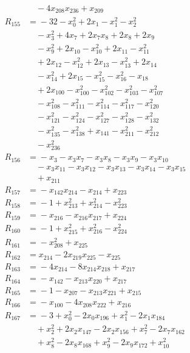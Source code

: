 \begin{align*}
&\quad{} -4x_{208}x_{236} +x_{209} \\
R_{155} &={} -32 -x_{0}^{2} +2x_{1} -x_{1}^{2} -x_{2}^{2} \\
&\quad{} -x_{3}^{2} +4x_{7} +2x_{7}x_{8} +2x_{8} +2x_{9} \\
&\quad{} -x_{9}^{2} +2x_{10} -x_{10}^{2} +2x_{11} -x_{11}^{2} \\
&\quad{} +2x_{12} -x_{12}^{2} +2x_{13} -x_{13}^{2} +2x_{14} \\
&\quad{} -x_{14}^{2} +2x_{15} -x_{15}^{2} -x_{16}^{2} -x_{18} \\
&\quad{} +2x_{100} -x_{100}^{2} -x_{102}^{2} -x_{103}^{2} -x_{107}^{2} \\
&\quad{} -x_{108}^{2} -x_{111}^{2} -x_{114}^{2} -x_{117}^{2} -x_{120}^{2} \\
&\quad{} -x_{121}^{2} -x_{124}^{2} -x_{127}^{2} -x_{128}^{2} -x_{132}^{2} \\
&\quad{} -x_{135}^{2} -x_{138}^{2} +x_{141} -x_{211}^{2} -x_{212}^{2} \\
&\quad{} -x_{236}^{2} \\
R_{156} &={} -x_{3} -x_{3}x_{7} -x_{3}x_{8} -x_{3}x_{9} -x_{3}x_{10} \\
&\quad{} -x_{3}x_{11} -x_{3}x_{12} -x_{3}x_{13} -x_{3}x_{14} -x_{3}x_{15} \\
&\quad{} +x_{211} \\
R_{157} &={} -x_{142}x_{214} -x_{214} +x_{223} \\
R_{158} &={} -1 +x_{213}^{2} +x_{214}^{2} -x_{223}^{2} \\
R_{159} &={} -x_{216} -x_{216}x_{217} +x_{224} \\
R_{160} &={} -1 +x_{215}^{2} +x_{216}^{2} -x_{224}^{2} \\
R_{161} &={} -x_{208}^{2} +x_{225} \\
R_{162} &={} x_{214} -2x_{219}x_{225} -x_{225} \\
R_{163} &={} -4x_{214} -8x_{214}x_{218} +x_{217} \\
R_{164} &={} -x_{142} -x_{213}x_{220} +x_{217} \\
R_{165} &={} -1 -x_{207} -x_{213}x_{221} +x_{215} \\
R_{166} &={} -x_{100} -4x_{208}x_{222} +x_{216} \\
R_{167} &={} -3 +x_{0}^{2} -2x_{0}x_{196} +x_{1}^{2} -2x_{1}x_{184} \\
&\quad{} +x_{2}^{2} +2x_{2}x_{147} -2x_{2}x_{156} +x_{7}^{2} -2x_{7}x_{162} \\
&\quad{} +x_{8}^{2} -2x_{8}x_{168} +x_{9}^{2} -2x_{9}x_{172} +x_{10}^{2} \\

\end{align*}

